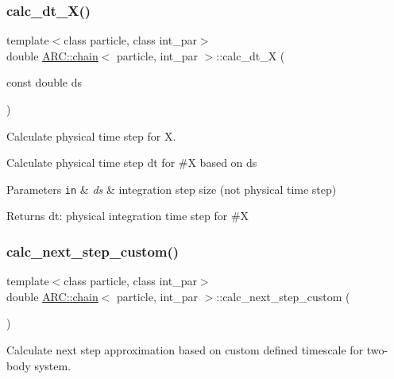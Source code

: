 \subsubsection{\texorpdfstring{calc\+\_\+dt\+\_\+\+X()}{calc\_dt\_X()}}
{\footnotesize\ttfamily template$<$class particle, class int\+\_\+par$>$ \\
double \hyperlink{classARC_1_1chain}{A\+R\+C\+::chain}$<$ particle, int\+\_\+par $>$\+::calc\+\_\+dt\+\_\+X (\begin{DoxyParamCaption}\item[{const double}]{ds }\end{DoxyParamCaption})\hspace{0.3cm}{\ttfamily [inline]}}



Calculate physical time step for X. 

Calculate physical time step dt for \#X based on ds 
\begin{DoxyParams}[1]{Parameters}
\mbox{\tt in}  & {\em ds} & integration step size (not physical time step) \\
\hline
\end{DoxyParams}
\begin{DoxyReturn}{Returns}
dt\+: physical integration time step for \#X 
\end{DoxyReturn}
\hypertarget{classARC_1_1chain_ab3984977684a6ca9bf2214cd957f56a0}{}\label{classARC_1_1chain_ab3984977684a6ca9bf2214cd957f56a0} 
\subsubsection{\texorpdfstring{calc\+\_\+next\+\_\+step\+\_\+custom()}{calc\_next\_step\_custom()}}
{\footnotesize\ttfamily template$<$class particle, class int\+\_\+par$>$ \\
double \hyperlink{classARC_1_1chain}{A\+R\+C\+::chain}$<$ particle, int\+\_\+par $>$\+::calc\+\_\+next\+\_\+step\+\_\+custom (\begin{DoxyParamCaption}{ }\end{DoxyParamCaption})\hspace{0.3cm}{\ttfamily [inline]}}



Calculate next step approximation based on custom defined timescale for two-\/body system. 


